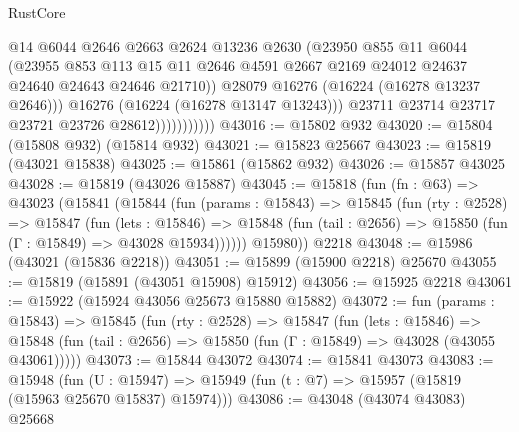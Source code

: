 \begin{lexlean}{RustCore}
\begin{coremodule}
                              @14
                              @6044
                              @2646
                              @2663
                              @2624
                              @13236
                              @2630
                              (@23950
                                @855
                                @11
                                @6044
                                (@23955
                                  @853
                                  @113
                                  @15
                                  @11
                                  @2646
                                  @4591
                                  @2667
                                  @2169
                                  @24012
                                  @24637
                                  @24640
                                  @24643
                                  @24646
                                  @21710))
                              @28079
                              @16276
                              (@16224 (@16278 @13237 @2646)))
                            @16276
                            (@16224 (@16278 @13147 @13243)))
                          @23711
                          @23714
                          @23717
                          @23721
                          @23726
                          @28612)))))))))))
@43016 := @15802 @932
@43020 := @15804 (@15808 @932) (@15814 @932)
@43021 := @15823 @25667
@43023 := @15819 (@43021 @15838)
@43025 := @15861 (@15862 @932)
@43026 := @15857 @43025
@43028 := @15819 (@43026 @15887)
@43045 := @15818
    (fun (fn : @63) =>
    @43023
      (@15841
        (@15844
          (fun (params : @15843) =>
          @15845
            (fun (rty : @2528) =>
            @15847
              (fun (lets : @15846) =>
              @15848 (fun (tail : @2656) => @15850 (fun (Γ : @15849) => @43028 @15934))))))
        @15980))
    @2218
@43048 := @15986 (@43021 (@15836 @2218))
@43051 := @15899 (@15900 @2218) @25670
@43055 := @15819 (@15891 (@43051 @15908) @15912)
@43056 := @15925 @2218
@43061 := @15922 (@15924 @43056 @25673 @15880 @15882)
@43072 := fun (params : @15843) =>
  @15845
    (fun (rty : @2528) =>
    @15847
      (fun (lets : @15846) =>
      @15848 (fun (tail : @2656) => @15850 (fun (Γ : @15849) => @43028 (@43055 @43061)))))
@43073 := @15844 @43072
@43074 := @15841 @43073
@43083 := @15948
    (fun (U : @15947) => @15949 (fun (t : @7) => @15957 (@15819 (@15963 @25670 @15837) @15974)))
@43086 := @43048 (@43074 @43083) @25668

\end{coremodule}
\end{lexlean}
